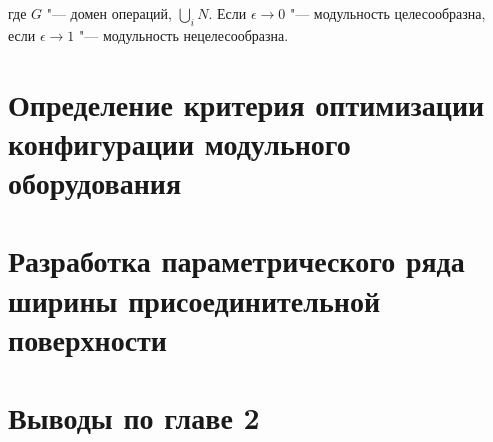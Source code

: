 \noindent где $G$ "--- домен операций, $\bigcup\limits_{i} N$. Если $\epsilon\rightarrow 0$ "--- модульность целесообразна, если $\epsilon\rightarrow 1$ "--- модульность нецелесообразна.

\section{Определение критерия оптимизации конфигурации модульного оборудования}

\section{Разработка параметрического ряда ширины присоединительной поверхности}

\section{Выводы по главе 2}


\FloatBarrier